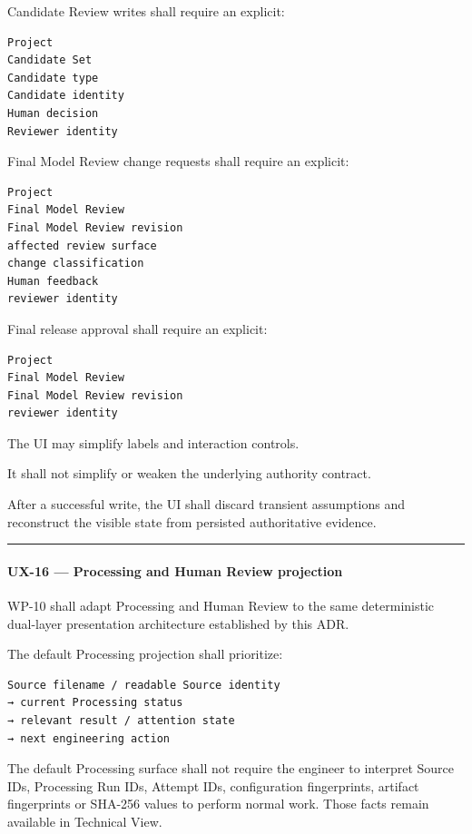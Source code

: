 Candidate Review writes shall require an explicit:

\begin{verbatim}
Project
Candidate Set
Candidate type
Candidate identity
Human decision
Reviewer identity
\end{verbatim}

Final Model Review change requests shall require an explicit:

\begin{verbatim}
Project
Final Model Review
Final Model Review revision
affected review surface
change classification
Human feedback
reviewer identity
\end{verbatim}

Final release approval shall require an explicit:

\begin{verbatim}
Project
Final Model Review
Final Model Review revision
reviewer identity
\end{verbatim}

The UI may simplify labels and interaction controls.

It shall not simplify or weaken the underlying authority contract.

After a successful write, the UI shall discard transient assumptions and reconstruct the visible state from persisted authoritative evidence.

\begin{center}\rule{0.5\linewidth}{0.5pt}\end{center}

\hypertarget{ux-16--processing-and-human-review-projection}{%
\paragraph{UX-16 --- Processing and Human Review projection}\label{ux-16--processing-and-human-review-projection}}

WP-10 shall adapt Processing and Human Review to the same deterministic dual-layer presentation architecture established by this ADR.

The default Processing projection shall prioritize:

\begin{verbatim}
Source filename / readable Source identity
→ current Processing status
→ relevant result / attention state
→ next engineering action
\end{verbatim}

The default Processing surface shall not require the engineer to interpret Source IDs, Processing Run IDs, Attempt IDs, configuration fingerprints, artifact fingerprints or SHA-256 values to perform normal work. Those facts remain available in Technical View.

